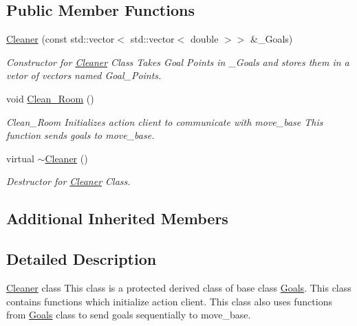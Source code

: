 \subsection*{Public Member Functions}
\begin{DoxyCompactItemize}
\item 
\hyperlink{classCleaner_a4e08e96dad7293b243e7a6856929e21b}{Cleaner} (const std\+::vector$<$ std\+::vector$<$ double $>$$>$ \&\+\_\+\+Goals)
\begin{DoxyCompactList}\small\item\em Constructor for \hyperlink{classCleaner}{Cleaner} Class Takes Goal Points in \+\_\+\+Goals and stores them in a vetor of vectors named Goal\+\_\+\+Points. \end{DoxyCompactList}\item 
void \hyperlink{classCleaner_a6a742590ac6256a15fcfaf6853fd6a97}{Clean\+\_\+\+Room} ()\hypertarget{classCleaner_a6a742590ac6256a15fcfaf6853fd6a97}{}\label{classCleaner_a6a742590ac6256a15fcfaf6853fd6a97}

\begin{DoxyCompactList}\small\item\em Clean\+\_\+\+Room Initializes action client to communicate with move\+\_\+base This function sends goals to move\+\_\+base. \end{DoxyCompactList}\item 
virtual \hyperlink{classCleaner_a86f390999d60ee10a0e53a5946369d9d}{$\sim$\+Cleaner} ()\hypertarget{classCleaner_a86f390999d60ee10a0e53a5946369d9d}{}\label{classCleaner_a86f390999d60ee10a0e53a5946369d9d}

\begin{DoxyCompactList}\small\item\em Destructor for \hyperlink{classCleaner}{Cleaner} Class. \end{DoxyCompactList}\end{DoxyCompactItemize}
\subsection*{Additional Inherited Members}


\subsection{Detailed Description}
\hyperlink{classCleaner}{Cleaner} class This class is a protected derived class of base class \hyperlink{classGoals}{Goals}. This class contains functions which initialize action client. This class also uses functions from \hyperlink{classGoals}{Goals} class to send goals sequentially to move\+\_\+base. 


